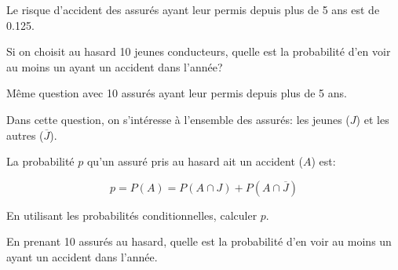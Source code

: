 \documentclass[a4paper,12pt]{scrartcl}
\begin{document}
Le risque d'accident des assurés ayant leur permis depuis plus de 5 ans est de 0.125.

\question{}Si on choisit au hasard 10 jeunes conducteurs, quelle est la probabilité d'en voir au moins un ayant un accident dans l'année?

\question{}Même question avec 10 assurés ayant leur permis depuis plus de 5 ans.

\question{}Dans cette question, on s'intéresse à l'ensemble des assurés: les jeunes ($J$) et les autres ($\overline{J}$). 

La probabilité $p$ qu'un assuré pris au hasard ait un accident ($A$) est: 

$$p = P(A) = P(A \cap J) + P\left(A \cap \overline{J}\right)$$

\subquestion{}En utilisant les probabilités conditionnelles, calculer $p$.

\subquestion{}En prenant 10 assurés au hasard, quelle est la probabilité d'en voir au moins un ayant un accident dans l'année.
 
\end{document}
